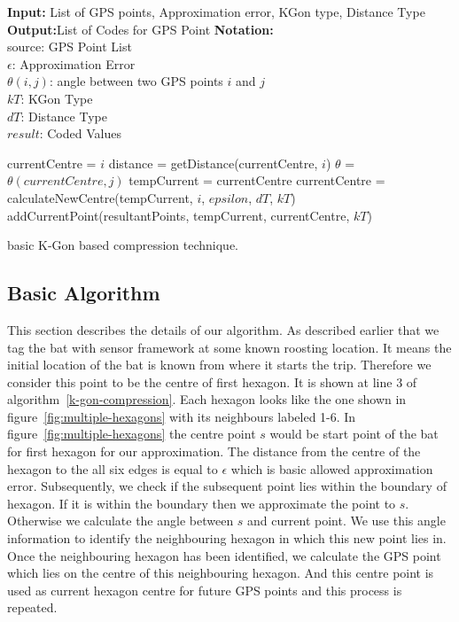 \documentclass[conference]{IEEEtran}
\begin{document}
\begin{algorithm}[ht]
\textbf{Input:} List of GPS points, Approximation error, KGon type, Distance Type\\
\textbf{Output:}List of Codes for GPS Point
\textbf{Notation:}\\
source: GPS Point List\\
$\epsilon$: Approximation Error\\
$\theta(i,j)$: angle between two GPS points $i$ and $j$\\
$kT$: KGon Type\\
$dT$: Distance Type\\
$result$: Coded Values
\begin{algorithmic}[1]
   \State currentCentre = $i$
\Else
   \State distance = getDistance(currentCentre, $i$)
   \State $\theta$ = $\theta(currentCentre,j)$
        \State tempCurrent = currentCentre
        \State currentCentre = calculateNewCentre(tempCurrent, $i$, $epsilon$, $dT$, $kT$)
        \State addCurrentPoint(resultantPoints, tempCurrent, currentCentre, $kT$)
    \EndIf
\EndIf
\EndFor
\end{algorithmic}
\caption{basic K-Gon based compression technique.}
\label{k-gon-compression}
\end{algorithm}

\subsection{Basic Algorithm}
\label{subs:algorithm}

This section describes the details of our algorithm. As described earlier that we tag the bat with sensor 
framework at some known roosting location. It means the initial location of the bat is known from where it 
starts the trip. Therefore we consider this point to be the centre of first hexagon. It is shown at line 3 
of algorithm~\ref{k-gon-compression}. Each hexagon looks like the one shown in figure~\ref{fig:multiple-hexagons}
with its neighbours labeled 1-6. In figure~\ref{fig:multiple-hexagons} the centre point $s$ would be start 
point of the bat for first hexagon for our approximation. The distance from the centre of the hexagon to the 
all six edges is equal to $\epsilon$ which is basic allowed approximation error. Subsequently, we check if 
the subsequent point lies within the boundary of hexagon. If it is within the boundary then we approximate 
the point to $s$. Otherwise we calculate the angle between $s$ and current point. We use this angle information 
to identify the neighbouring hexagon in which this new point lies in. Once the neighbouring hexagon has been 
identified, we calculate the GPS point which lies on the centre of this neighbouring hexagon. And this centre 
point is used as current hexagon centre for future GPS points and this process is repeated.
\end{document}
